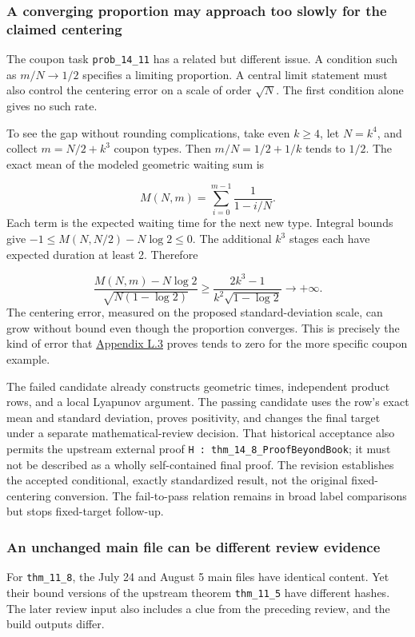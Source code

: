 \subsubsection[A converging proportion may approach too slowly for the claimed centering]{\texorpdfstring{\protect\hypertarget{l4-2}{}A converging proportion may approach too slowly for the claimed centering}{A converging proportion may approach too slowly for the claimed centering}}
The coupon task \nolinkurl{prob_14_11} has a related but different issue. A condition such as $m/N\to1/2$ specifies a limiting proportion. A central limit statement must also control the centering error on a scale of order $\sqrt N$. The first condition alone gives no such rate.

To see the gap without rounding complications, take even $k\geq4$, let $N=k^4$, and collect $m=N/2+k^3$ coupon types. Then $m/N=1/2+1/k$ tends to $1/2$. The exact mean of the modeled geometric waiting sum is

\[
M(N,m)=\sum_{i=0}^{m-1}\frac{1}{1-i/N}.
\]
Each term is the expected waiting time for the next new type. Integral bounds give $-1\leq M(N,N/2)-N\log2\leq0$. The additional $k^3$ stages each have expected duration at least 2. Therefore

\[
\frac{M(N,m)-N\log2}{\sqrt{N(1-\log2)}}
\geq\frac{2k^3-1}{k^2\sqrt{1-\log2}}
\longrightarrow +\infty.
\]
The centering error, measured on the proposed standard-deviation scale, can grow without bound even though the proportion converges. This is precisely the kind of error that \hyperlink{l3}{Appendix L.3} proves tends to zero for the more specific coupon example.

The failed candidate already constructs geometric times, independent product rows, and a local Lyapunov argument. The passing candidate uses the row's exact mean and standard deviation, proves positivity, and changes the final target under a separate mathematical-review decision. That historical acceptance also permits the upstream external proof \nolinkurl{H : thm_14_8_ProofBeyondBook}; it must not be described as a wholly self-contained final proof. The revision establishes the accepted conditional, exactly standardized result, not the original fixed-centering conversion. The fail-to-pass relation remains in broad label comparisons but stops fixed-target follow-up.

\subsubsection[An unchanged main file can be different review evidence]{\texorpdfstring{\protect\hypertarget{l4-3}{}An unchanged main file can be different review evidence}{An unchanged main file can be different review evidence}}
For \nolinkurl{thm_11_8}, the July 24 and August 5 main files have identical content. Yet their bound versions of the upstream theorem \nolinkurl{thm_11_5} have different hashes. The later review input also includes a clue from the preceding review, and the build outputs differ.

